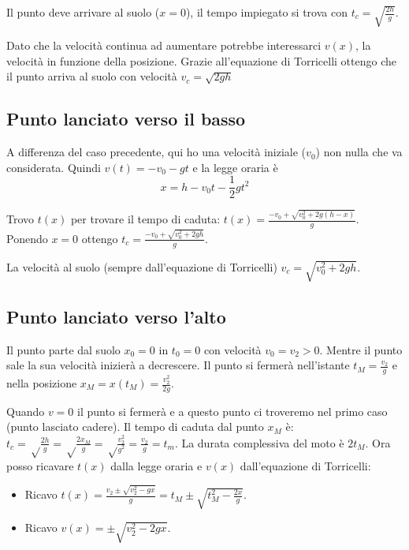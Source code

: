 \documentclass[class=book, crop=false, oneside, 12pt]{standalone}
\begin{document}
Il punto deve arrivare al suolo (\(x=0\)), il tempo impiegato si trova
con \(t_c = \sqrt {\frac {2h} {g}}\).

Dato che la velocità continua ad aumentare potrebbe interessarci
\(v(x)\), la velocità in funzione della posizione. Grazie all'equazione
di Torricelli ottengo che il punto arriva al suolo con velocità
\(v_c = \sqrt {2gh}\)

\subsection{Punto lanciato verso il basso}

A differenza del caso precedente, qui ho una velocità iniziale (\(v_0\))
non nulla che va considerata. Quindi \(v(t) = -v_0 -gt\) e la legge
oraria è
\begin{equation}
  x = h - v_0t - \frac {1} {2 } gt^2
\end{equation}

Trovo \(t(x)\) per trovare il tempo di caduta:
\(t(x) = \frac {-v_0 + \sqrt {v_0^2 + 2g (h-x)}} {g}\). Ponendo \(x=0\)
ottengo \(t_c = \frac {-v_0 + \sqrt {v_0^2 + 2g h}} {g}\).

La velocità al suolo (sempre dall'equazione di Torricelli)
\(v_c = \sqrt {v_0^2 + 2gh}\).

\subsection{Punto lanciato verso l'alto}

Il punto parte dal suolo \(x_0 = 0\) in \(t_0 = 0\) con velocità
\(v_ 0 =v_2 > 0\). Mentre il punto sale la sua velocità inizierà a
decrescere. Il punto si fermerà nell'istante \(t_M = \frac {v_2} g\) e
nella posizione \(x_M = x(t_M) = \frac {v_2^2} {2g}\).

Quando \(v = 0\) il punto si fermerà e a questo punto ci troveremo nel
primo caso (punto lasciato cadere). Il tempo di caduta dal punto \(x_M\)
è:
\(t_c = \sqrt \frac {2h}{g} = \sqrt \frac {2 x_M}{g} = \sqrt \frac {v_2^2}{g^2} = \frac {v_2} {g} = t_m\).
La durata complessiva del moto è \(2t_M\). Ora posso ricavare \(t(x)\)
dalla legge oraria e \(v(x)\) dall'equazione di Torricelli:

\begin{itemize}
\item
  Ricavo
  \(t(x) = \frac {v_2 \pm {\sqrt{v_2^2 -gx}}}{g} = t_M \pm \sqrt {t_M^2 - \frac {2x}{g}}\).
\item
  Ricavo \(v(x) = \pm \sqrt {v_2^2 -2gx}\).
\end{itemize}
\end{document}
